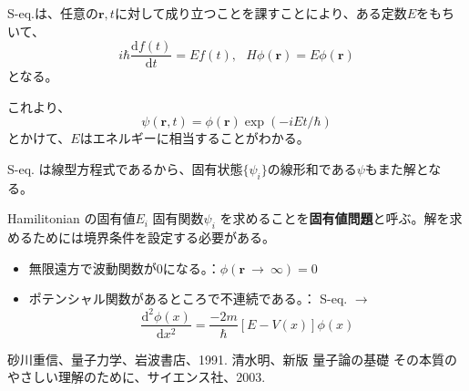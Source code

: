 \documentclass[a4j,10pt,oneside,openany]{jsbook}
\newcommand{\derivative}[2]{\frac{\mathrm{d} #1}{\mathrm{d} #2}}\newcommand{\dderivative}[2]{\frac{\mathrm{d}^2 #1}{\mathrm{d} {#2}^2}}
\begin{document}
S-eq.は、任意の$\bm{r}, t$に対して成り立つことを課すことにより、ある定数$E$をもちいて、
\[
	i\hbar \derivative{f(t)}{t} = Ef(t),\ \ \ H\phi(\bm{r}) = E\phi(\bm{r})
\]
となる。

これより、
\[
	\psi(\bm{r}, t) = \phi(\bm{r}) \exp (-iEt/\hbar)
\]
とかけて、$E$はエネルギーに相当することがわかる。

S-eq. は線型方程式であるから、固有状態$\{ \psi_i \}$の線形和である$\psi$もまた解となる。

Hamilitonian の固有値$E_i$ 固有関数$\psi_i$ を求めることを\textbf{固有値問題}と呼ぶ。解を求めるためには境界条件を設定する必要がある。

\begin{itemize}
	\item 無限遠方で波動関数が0になる。：$\phi(\bm{r}\ \rightarrow\ \infty) = 0 $
	\item ポテンシャル関数があるところで不連続である。：
	S-eq. $\rightarrow$
	\[
			\dderivative{\phi(x)}{x} = \frac{-2m}{\hbar} [E-V(x)] \phi(x)
	\]
\end{itemize}

\begin{thebibliography}{20}
  砂川重信、量子力学、岩波書店、1991.
  清水明、新版 量子論の基礎 その本質のやさしい理解のために、サイエンス社、2003.
\end{thebibliography}
\newpage
\printindex
%
%
\end{document}
